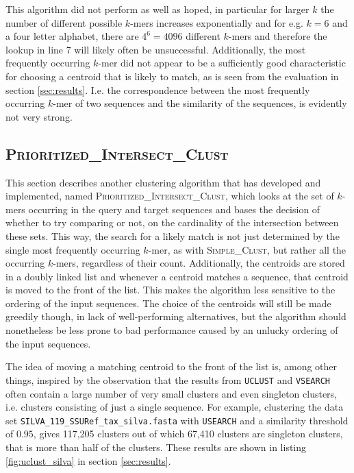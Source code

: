 This algorithm did not perform as well as hoped, in particular for larger $k$
the number of different possible $k$-mers increases exponentially and for e.g.
$k = 6$ and a four letter alphabet, there are $4^6 = 4096$ different $k$-mers
and therefore the lookup in line 7 will likely often be unsuccessful.
Additionally, the most frequently occurring $k$-mer did not appear to be a
sufficiently good characteristic for choosing a centroid that is likely to
match, as is seen from the evaluation in section \ref{sec:results}. I.e. the
correspondence between the most frequently occurring $k$-mer of two sequences
and the similarity of the sequences, is evidently not very strong.  %


\subsection{\textsc{Prioritized\_Intersect\_Clust}}

This section describes another clustering algorithm that has developed and
implemented, named \textsc{Prioritized\_Intersect\_Clust}, which looks at the
set of $k$-mers occurring in the query and target sequences and bases the
decision of whether to try comparing or not, on the cardinality of the
intersection between these sets. This way, the search for a likely match is not
just determined by the single most frequently occurring $k$-mer, as with
\textsc{Simple\_Clust}, but rather all the occurring $k$-mers, regardless of
their count. Additionally, the centroids are stored in a doubly linked list and
whenever a centroid matches a sequence, that centroid is moved to the front of
the list. This makes the algorithm less sensitive to the ordering of the input
sequences. The choice of the centroids will still be made greedily though, in
lack of well-performing alternatives, but the algorithm should nonetheless be
less prone to bad performance caused by an unlucky ordering of the input
sequences.

The idea of moving a matching centroid to the front of the list is, among other
things, inspired by the observation that the results from \texttt{UCLUST} and
\texttt{VSEARCH} often contain a large number of very small clusters and even
singleton clusters, i.e. clusters consisting of just a single sequence. For
example, clustering the data set \texttt{SILVA\_119\_SSURef\_tax\_silva.fasta}
with \texttt{USEARCH} and a similarity threshold of $0.95$, gives 117,205
clusters out of which 67,410 clusters are singleton clusters, that is more than
half of the clusters. These results are shown in listing \ref{fig:uclust_silva}
in section \ref{sec:results}.

